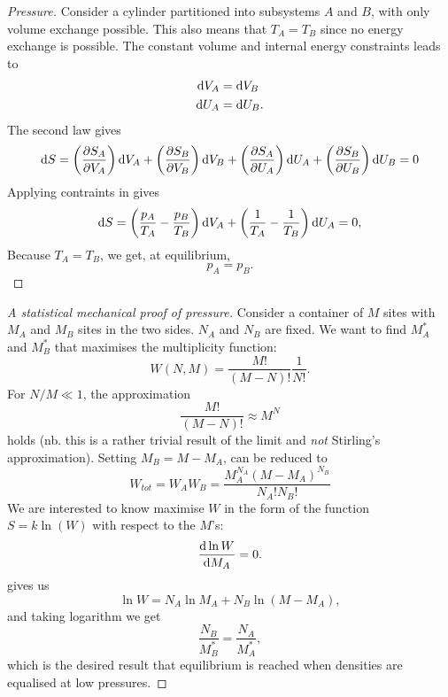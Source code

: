 \begin{proof}[Pressure]
Consider a cylinder partitioned into subsystems $A$ and $B$, with only volume exchange possible. This also means that $T_A=T_B$ since no energy exchange is possible. The constant volume and internal energy constraints leads to
\begin{subequations}
\label{constr_p}
\begin{align}
\dif V_A&=\dif V_B \\
\dif U_A&=\dif U_B. 
\end{align}
\end{subequations}
The second law gives
\begin{equation}
\dif S=\left(\diffp{S_A}{V_A}\right)\dif V_A+\left(\diffp{S_B}{V_B}\right)\dif V_B+\left(\diffp{S_A}{U_A}\right)\dif U_A+\left(\diffp{S_B}{U_B}\right)\dif U_B=0
\end{equation}
Applying contraints in  gives 
\begin{equation}
\dif S=\left(\frac{p_A}{T_A}-\frac{p_B}{T_B}\right)\dif V_A + \left(\frac{1}{T_A}-\frac{1}{T_B}\right)\dif U_A=0, 
\end{equation}
Because $T_A=T_B$, we get, at equilibrium, 
\begin{equation}
p_A=p_B.
\end{equation}
\end{proof}
\begin{proof}[A statistical mechanical proof of pressure]
Consider a container of $M$ sites with $M_A$ and $M_B$ sites in the two sides. 
$N_A$ and $N_B$ are fixed. We want to find $M_A^*$ and $M_B^*$ that maximises the multiplicity function: 
\begin{equation}
\label{pres_mult}
W(N,M)=\frac{M!}{(M-N)!}\frac{1}{N!}. 
\end{equation}
For $N/M\ll1$, the approximation
\begin{equation}
\frac{M!}{(M-N)!}\approx M^N
\end{equation}
holds (nb. this is a rather trivial result of the limit and \textit{not} Stirling's approximation). Setting $M_B=M-M_A$,  can be reduced to 
\begin{equation}
\label{pres_simp}
W_{tot}=W_AW_B=\frac{M_A^{N_A}(M-M_A)^{N_B}}{N_A!N_B!}
\end{equation}
We are interested to know maximise $W$ in the form of the function $S=k\ln(W)$ with respect to the $M$'s: 
\begin{equation}
\diff{\ln W}{M_A}=0. 
\end{equation}
 gives us
\begin{equation}
\ln W=N_A\ln M_A+N_B\ln(M-M_A), 
\end{equation}
and taking logarithm we get 
\begin{equation}
\frac{N_B}{M_B^*}=\frac{N_A}{M_A^*}, 
\end{equation}
which is the desired result that equilibrium is reached when densities are equalised at low pressures.
\end{proof}
